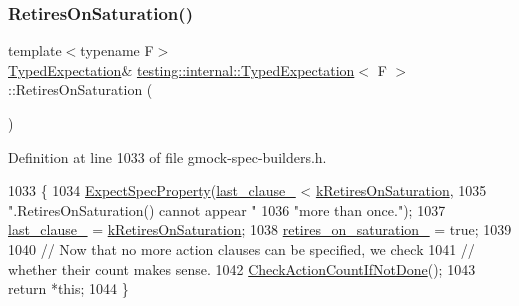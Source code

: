 \subsubsection{\texorpdfstring{Retires\+On\+Saturation()}{RetiresOnSaturation()}}
{\footnotesize\ttfamily template$<$typename F$>$ \\
\hyperlink{classtesting_1_1internal_1_1TypedExpectation}{Typed\+Expectation}\& \hyperlink{classtesting_1_1internal_1_1TypedExpectation}{testing\+::internal\+::\+Typed\+Expectation}$<$ F $>$\+::Retires\+On\+Saturation (\begin{DoxyParamCaption}{ }\end{DoxyParamCaption})\hspace{0.3cm}{\ttfamily [inline]}}



Definition at line 1033 of file gmock-\/spec-\/builders.\+h.


\begin{DoxyCode}
1033                                           \{
1034     \hyperlink{classtesting_1_1internal_1_1ExpectationBase_a652adbe3fcca2950175e3859d59af268}{ExpectSpecProperty}(\hyperlink{classtesting_1_1internal_1_1ExpectationBase_a584f296e53b4cc002ddf5e65e44d72d9}{last\_clause\_} < 
      \hyperlink{classtesting_1_1internal_1_1ExpectationBase_a450f34b979ec5814c91d4eab6b78cfc2a816336e701d7be1ca9e07998d41ba5af}{kRetiresOnSaturation},
1035                        \textcolor{stringliteral}{".RetiresOnSaturation() cannot appear "}
1036                        \textcolor{stringliteral}{"more than once."});
1037     \hyperlink{classtesting_1_1internal_1_1ExpectationBase_a584f296e53b4cc002ddf5e65e44d72d9}{last\_clause\_} = \hyperlink{classtesting_1_1internal_1_1ExpectationBase_a450f34b979ec5814c91d4eab6b78cfc2a816336e701d7be1ca9e07998d41ba5af}{kRetiresOnSaturation};
1038     \hyperlink{classtesting_1_1internal_1_1ExpectationBase_a74802f3bedf4ab023b30ee6bb275a4d8}{retires\_on\_saturation\_} = \textcolor{keyword}{true};
1039 
1040     \textcolor{comment}{// Now that no more action clauses can be specified, we check}
1041     \textcolor{comment}{// whether their count makes sense.}
1042     \hyperlink{classtesting_1_1internal_1_1ExpectationBase_aaeb143b6f8676e9a6fb9b17678344f03}{CheckActionCountIfNotDone}();
1043     \textcolor{keywordflow}{return} *\textcolor{keyword}{this};
1044   \}
\end{DoxyCode}
\mbox{\label{classtesting_1_1internal_1_1TypedExpectation_a833f473cc3563f566fbfe143682bd05a}} 
